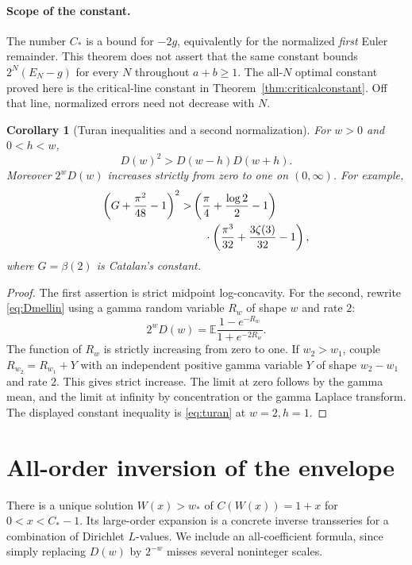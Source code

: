 \documentclass[11pt,a4paper]{article}
\numberwithin{equation}{section}
\newtheorem{corollary}[theorem]{Corollary}
\theoremstyle{definition}
\theoremstyle{remark}
\begin{document}
\paragraph{Scope of the constant.}
The number $C_*$ is a bound for $-2g$, equivalently for the normalized
\emph{first} Euler remainder. This theorem does not assert that the same
constant bounds $2^N(E_N-g)$ for every $N$ throughout $a+b\ge1$.
The all-$N$ optimal constant proved here is the critical-line constant
in Theorem~\ref{thm:criticalconstant}. Off that line, normalized errors
need not decrease with $N$.

\begin{corollary}[Turan inequalities and a second normalization]
\label{cor:turan}
For $w>0$ and $0<h<w$,
\begin{equation}\label{eq:turan}
 D(w)^2>D(w-h)D(w+h).
\end{equation}
Moreover $2^wD(w)$ increases strictly from zero to one on $(0,\infty)$.
For example,
\begin{align}\label{eq:catalanineq}
 \left(G+\frac{\pi^2}{48}-1\right)^2
 >&\left(\frac\pi4+\frac{\log2}{2}-1\right)\notag\\
 &\hspace{4mm}\cdot\left(\frac{\pi^3}{32}
                         +\frac{3\zeta(3)}{32}-1\right),
\end{align}
where $G=\beta(2)$ is Catalan's constant.
\end{corollary}
\begin{proof}
The first assertion is strict midpoint log-concavity. For the second,
rewrite \eqref{eq:Dmellin} using a gamma random variable $R_w$ of shape
$w$ and rate $2$:
\[
 2^wD(w)=\mathbb E\frac{1-e^{-R_w}}{1+e^{-2R_w}}.
\]
The function of $R_w$ is strictly increasing from zero to one. If
$w_2>w_1$, couple $R_{w_2}=R_{w_1}+Y$ with an independent positive gamma
variable $Y$ of shape $w_2-w_1$ and rate $2$. This gives strict increase.
The limit at zero follows by the gamma mean, and the limit at infinity
by concentration or the gamma Laplace transform. The displayed
constant inequality is \eqref{eq:turan} at $w=2,h=1$.
\end{proof}

\section{All-order inversion of the envelope}
\label{sec:inversion}

There is a unique solution $W(x)>w_*$ of $C(W(x))=1+x$ for
$0<x<C_*-1$. Its large-order expansion is a concrete inverse
transseries for a combination of Dirichlet $L$-values. We include
an all-coefficient formula, since simply replacing $D(w)$ by $2^{-w}$
misses several noninteger scales.
\end{document}
